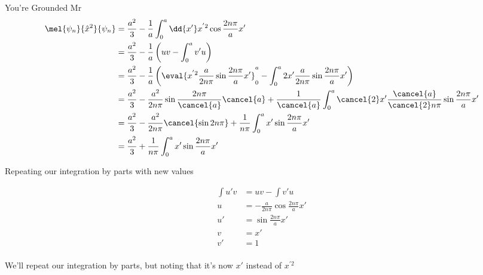 \begin{answer}
\begin{answerpart}{You're Grounded Mr}
    \begin{equation}
      \begin{split}
        \mel{\psi_n}{\hat{x}^2}{\psi_n}
        &=
        \frac{a^2}{3}
        -
        \frac{1}{a}
        \int_0^a \dd{x'}
        x^{'2}
        \cos{\frac{2n\pi}{a}x'}
        \\
        &=
        \frac{a^2}{3}
        -
        \frac{1}{a}
        \left(
        uv - \int_0^a v'u
        \right)
        \\
        &=
        \frac{a^2}{3}
        -
        \frac{1}{a}
        \left(
        \eval{
          x^{'2}\frac{a}{2n\pi}\sin{\frac{2n\pi}{a}x'}
        }_0^a
        - \int_0^a
        2x'\frac{a}{2n\pi}\sin{\frac{2n\pi}{a}x'}
        \right)
        \\
        &=
        \frac{a^2}{3}
        -
        \frac{a^2}{2n\pi}\sin{\frac{2n\pi}{\cancel{a}}\cancel{a}}
        +
        \frac{1}{\cancel{a}}
        \int_0^a
        \cancel{2}x'\frac{\cancel{a}}{\cancel{2}n\pi}\sin{\frac{2n\pi}{a}x'}
        \\
        &=
        \frac{a^2}{3}
        -
        \frac{a^2}{2n\pi}\cancel{\sin{2n\pi}}
        +
        \frac{1}{n\pi}
        \int_0^a
        x'\sin{\frac{2n\pi}{a}x'}
        \\
        &=
        \frac{a^2}{3}
        +
        \frac{1}{n\pi}
        \int_0^a
        x'\sin{\frac{2n\pi}{a}x'}
        \\
      \end{split}
    \end{equation}

    Repeating our integration by parts with new values

    \begin{equation}
      \begin{split}
        \int u'v &= uv - \int v'u\\
        u &= -\frac{a}{2n\pi}\cos{\frac{2n\pi}{a}x'}\\
        u' &= \sin{\frac{2n\pi}{a}x'}\\
        v &= x'\\
        v' &= 1 \\
      \end{split}
    \end{equation}
    
    
    We'll repeat our integration by parts, but noting that it's now
    $x'$ instead of $x^{'2}$


\end{answerpart}
\end{answer}
